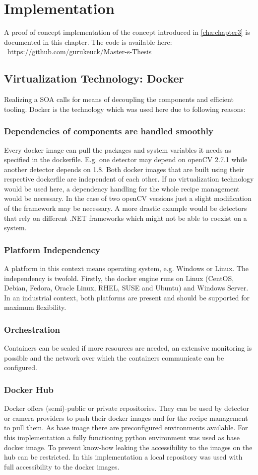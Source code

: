 \chapter{Implementation\label{cha:chapter4}}
A proof of concept implementation of the concept introduced in \ref{cha:chapter3} is documented in this chapter. The code is available here: \ https://github.com/gurukeuck/Master-s-Thesis

\section{Virtualization Technology: Docker}
Realizing a SOA calls for means of decoupling the components and efficient tooling. Docker is the technology which was used here due to following reasons:
\subsection{Dependencies of components are handled smoothly} 
Every docker image can pull the packages and system variables it needs as specified in the dockerfile. E.g. one detector may depend on openCV 2.7.1 while another detector depends on 1.8. Both docker images that are built using their respective dockerfile are independent of each other. If no virtualization technology would be used here, a dependency handling for the whole recipe management would be necessary. In the case of two openCV versions just a slight modification of the framework may be necessary. A more drastic example would be detectors that rely on different .NET frameworks which might not be able to coexist on a system.
\subsection{Platform Independency}
 A platform in this context means operating system, e.g. Windows or Linux. The independency is twofold. Firstly, the docker engine runs on Linux (CentOS, Debian, Fedora, Oracle Linux, RHEL, SUSE and Ubuntu) and Windows Server. In an industrial context, both platforms are present and should be supported for maximum flexibility.
\subsection{Orchestration}
 Containers can be scaled if more resources are needed, an extensive monitoring is possible and the network over which the containers communicate can be configured. 
\subsection{Docker Hub}
 Docker offers (semi)-public or private repositories. They can be used by detector or camera providers to push their docker images and for the recipe management to pull them. As base image there are preconfigured environments available. For this implementation a fully functioning python environment was used as base docker image. To prevent know-how leaking the accessibility to the images on the hub can be restricted. In this implementation a local repository was used with full accessibility to the docker images.
